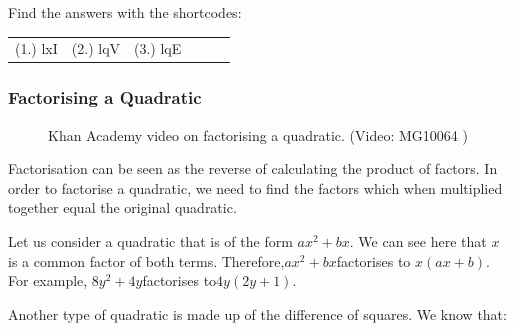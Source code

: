   \label{m39383**end}
\par {} Find the answers with the shortcodes:
 \par \begin{tabular}[h]{cccccc}
 (1.) lxI  &  (2.) lqV  &  (3.) lqE  & \end{tabular}
    \label{m39394*cid5}
            \subsubsection{ Factorising a Quadratic}
            \nopagebreak
      \label{m39394*eip-218}
    \setcounter{subfigure}{0}
	\begin{figure}[H] %
    \textnormal{Khan Academy video on factorising a quadratic.}\vspace{.1in} \nopagebreak
  \label{m39394*yt-media2}\label{m39394*yt-video2}
             { (Video:  MG10064 )}
      \vspace{2pt}
    \vspace{.1in}
 \end{figure}       \par \label{m39394*eip-411}Factorisation can be seen as the reverse of calculating the product of factors. In order to factorise a quadratic, we need to find the factors which when multiplied together equal the original quadratic.\par 
      \label{m39394*id275057}Let us consider a quadratic that is of the form $a{x}^{2}+bx$\hspace{1ex}. We can see here that $x$ is a common factor of both terms. Therefore,\hspace{1ex}$a{x}^{2}+bx$\hspace{1ex}factorises to $x\left(ax+b\right)$. For example, $8{y}^{2}+4y$\hspace{1ex}factorises to\hspace{1ex}$4y\left(2y+1\right)$.\par 
      \label{m39394*id275188}Another type of quadratic is made up of the difference of squares. We know that:\par 

